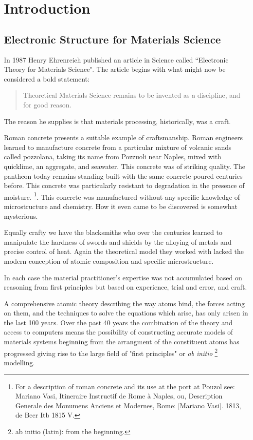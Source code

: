 \chapter{Introduction}
\section{Electronic Structure for Materials Science}
In 1987 Henry Ehrenreich published an article in Science called
``Electronic Theory for Materials Science". The article begins
with what might now be considered a bold statement:

\begin{quote}
Theoretical Materials Science remains to be invented as a discipline, and for good reason.
\end{quote}

The reason he supplies is that materials processing, historically, was a craft. 

Roman concrete presents a suitable example of craftsmanship.
Roman engineers learned to manufacture concrete from a 
particular mixture of volcanic sands called pozzolana,
taking its name from Pozzuoli near Naples, mixed with quicklime, an aggregate, and seawater.
This concrete was of striking quality. The pantheon today remains standing 
built with the same concrete poured centuries before.
This concrete was particularly resistant to degradation in the presence of moisture.
\footnote{For a description of roman concrete and its use at the port at Pouzol see: Mariano Vasi, 
Itineraire Instructif de Rome à Naples, ou, Description Generale des Monumens Anciens et Modernes, 
Rome: [Mariano Vasi]. 1813, de Beer Itb 1815 V.}. 
This concrete was manufactured without any specific knowledge of microstructure and 
chemistry. How it even came to be discovered is somewhat mysterious.

Equally crafty we have the blacksmiths who over the centuries learned to manipulate the 
hardness of swords and shields by the alloying of metals and precise control of heat. 
Again the theoretical model they worked with lacked the modern conception of 
atomic composition and specific microstructure.

In each case the material practitioner's expertise was not accumulated based on reasoning 
from first principles but based on experience, trial and error, and craft.

A comprehensive atomic theory describing the way atoms bind, the forces acting on them, 
and the techniques to solve the equations which arise, has only arisen in the last 100 years. 
Over the past 40 years the combination of the theory and access to computers 
means the possibility of constructing accurate models of materials 
systems beginning from the arrangment of the constituent atoms has
progressed giving rise to the large field of "first principles" or {\it ab initio}
\footnote{ab initio (latin): from the beginning.} modelling.

